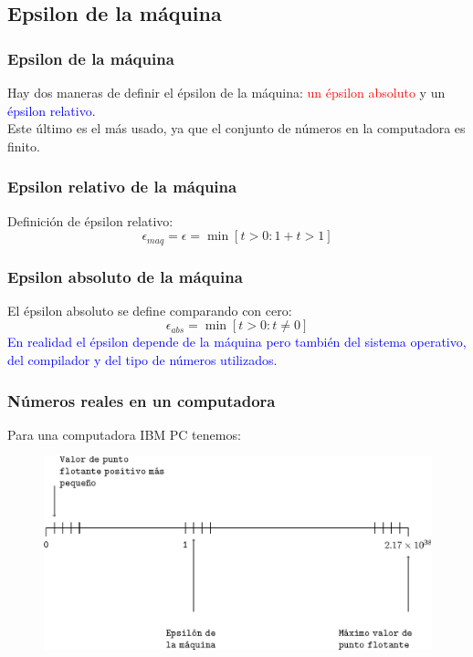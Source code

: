 \subsection{Epsilon de la máquina}
\begin{frame}
\frametitle{Epsilon de la máquina}
Hay dos maneras de definir el épsilon de la máquina: \textcolor{red}{un épsilon absoluto} y un \textcolor{blue}{épsilon relativo}.
\\
\bigskip
Este último es el más usado, ya que el conjunto de números en la computadora es finito.
\end{frame}
\begin{frame}
\frametitle{Epsilon relativo de la máquina}
Definición de épsilon relativo:
\[ \epsilon_{maq} = \epsilon = \min[t>0 : 1+t>1 ] \]
\end{frame}
\begin{frame}
\frametitle{Epsilon absoluto de la máquina}
El épsilon absoluto se define comparando con cero:
\[ \epsilon_{abs} = \min[t>0 : t \neq 0] \]
\textcolor{blue}{En realidad el épsilon depende de la máquina pero también del sistema operativo, del compilador y del tipo de números utilizados.}
\end{frame}
\begin{frame}
\frametitle{Números reales en un computadora}
Para una computadora IBM PC tenemos:
\fontsize{10}{10}\selectfont
\begin{figure}
\centering
\includegraphics[scale=0.8]{epsilonmaquina.eps}
\end{figure}
\end{frame}
